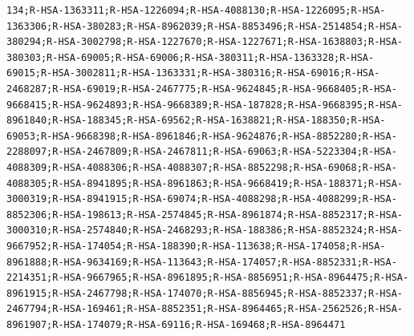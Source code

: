 \documentclass[
  letterpaper,
  DIV=11,
  numbers=noendperiod]{scrartcl}
\begin{document}
\begin{verbatim}
134;R-HSA-1363311;R-HSA-1226094;R-HSA-4088130;R-HSA-1226095;R-HSA-1363306;R-HSA-380283;R-HSA-8962039;R-HSA-8853496;R-HSA-2514854;R-HSA-380294;R-HSA-3002798;R-HSA-1227670;R-HSA-1227671;R-HSA-1638803;R-HSA-380303;R-HSA-69005;R-HSA-69006;R-HSA-380311;R-HSA-1363328;R-HSA-69015;R-HSA-3002811;R-HSA-1363331;R-HSA-380316;R-HSA-69016;R-HSA-2468287;R-HSA-69019;R-HSA-2467775;R-HSA-9624845;R-HSA-9668405;R-HSA-9668415;R-HSA-9624893;R-HSA-9668389;R-HSA-187828;R-HSA-9668395;R-HSA-8961840;R-HSA-188345;R-HSA-69562;R-HSA-1638821;R-HSA-188350;R-HSA-69053;R-HSA-9668398;R-HSA-8961846;R-HSA-9624876;R-HSA-8852280;R-HSA-2288097;R-HSA-2467809;R-HSA-2467811;R-HSA-69063;R-HSA-5223304;R-HSA-4088309;R-HSA-4088306;R-HSA-4088307;R-HSA-8852298;R-HSA-69068;R-HSA-4088305;R-HSA-8941895;R-HSA-8961863;R-HSA-9668419;R-HSA-188371;R-HSA-3000319;R-HSA-8941915;R-HSA-69074;R-HSA-4088298;R-HSA-4088299;R-HSA-8852306;R-HSA-198613;R-HSA-2574845;R-HSA-8961874;R-HSA-8852317;R-HSA-3000310;R-HSA-2574840;R-HSA-2468293;R-HSA-188386;R-HSA-8852324;R-HSA-9667952;R-HSA-174054;R-HSA-188390;R-HSA-113638;R-HSA-174058;R-HSA-8961888;R-HSA-9634169;R-HSA-113643;R-HSA-174057;R-HSA-8852331;R-HSA-2214351;R-HSA-9667965;R-HSA-8961895;R-HSA-8856951;R-HSA-8964475;R-HSA-8961915;R-HSA-2467798;R-HSA-174070;R-HSA-8856945;R-HSA-8852337;R-HSA-2467794;R-HSA-169461;R-HSA-8852351;R-HSA-8964465;R-HSA-2562526;R-HSA-8961907;R-HSA-174079;R-HSA-69116;R-HSA-169468;R-HSA-8964471

\end{verbatim}
\end{document}
